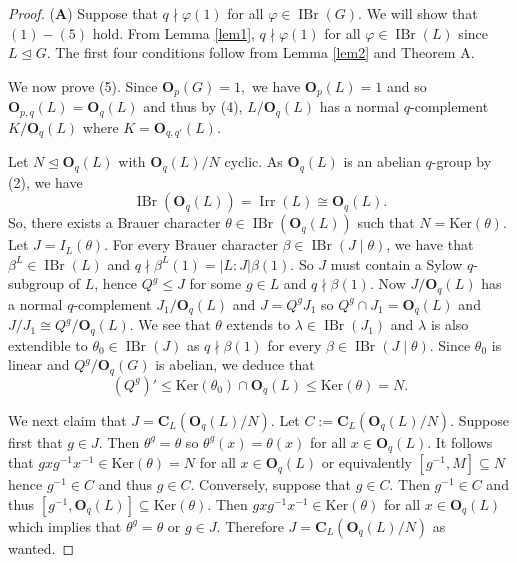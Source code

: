 \documentclass[12pt]{amsart}
\theoremstyle{remark}
\numberwithin{equation}{section}
\begin{document}
\begin{proof}

(\textbf{A}) Suppose that $q\nmid \varphi(1)$ for all $\varphi\in\operatorname{IBr}(G).$ We will show that $(1)-(5)$ hold. From Lemma \ref{lem1}, $q\nmid \varphi(1)$ for all $\varphi\in\operatorname{IBr}(L)$ since $L\unlhd G.$ The first four conditions follow from Lemma \ref{lem2} and Theorem A.

We now prove (5). Since ${\mathbf{O}}_p(G)=1,$ we have ${\mathbf{O}}_p(L)=1$ and so ${\mathbf{O}}_{p,q}(L)={\mathbf{O}}_q(L)$ and thus by (4), $L/{\mathbf{O}}_q(L)$ has a normal $q$-complement $K/{\mathbf{O}}_q(L)$ where $K={\mathbf{O}}_{q,q'}(L).$

Let $N\unlhd {\mathbf{O}}_q(L)$ with ${\mathbf{O}}_q(L)/N$ cyclic. As ${\mathbf{O}}_q(L)$ is an abelian $q$-group by (2), we have $$\operatorname{IBr}({\mathbf{O}}_q(L))=\operatorname{Irr}(L)\cong {\mathbf{O}}_q(L).$$ So, there exists a Brauer character $\theta\in\operatorname{IBr}({\mathbf{O}}_q(L))$ such that $N={{\mathrm {Ker}}}(\theta).$ Let $J=I_L(\theta).$ For every Brauer character $\beta\in\operatorname{IBr}(J \mid \theta)$, we have that $\beta^L\in\operatorname{IBr}(L)$ and $q\nmid \beta^L(1)=|L:J|\beta(1).$ So $J$ must contain a Sylow $q$-subgroup of $L$, hence $Q^g\leq J$ for some $g\in L$ and $q\nmid \beta(1).$ Now $J/{\mathbf{O}}_q(L)$ has a normal $q$-complement $J_1/{\mathbf{O}}_q(L)$ and $J=Q^gJ_1$ so $Q^g\cap J_1={\mathbf{O}}_q(L)$ and $J/J_1\cong Q^g/{\mathbf{O}}_q(L).$ We see that $\theta$ extends to $\lambda\in\operatorname{IBr}(J_1)$ and $\lambda$ is also extendible to $\theta_0\in\operatorname{IBr}(J)$ as $q\nmid \beta(1)$ for every $\beta\in\operatorname{IBr}(J \mid \theta)$. Since $\theta_0$ is linear and $Q^g/{\mathbf{O}}_q(G)$ is abelian, we deduce that $$(Q^g)'\leq {{\mathrm {Ker}}}(\theta_0)\cap {\mathbf{O}}_q(L)\le {{\mathrm {Ker}}}(\theta)=N.$$

\medskip
We next claim that $J={\mathbf{C}}_L({\mathbf{O}}_q(L)/N).$ Let $C:={\mathbf{C}}_L({\mathbf{O}}_q(L)/N).$ Suppose first that $g\in J.$ Then $\theta^g=\theta$ so $\theta^g(x)=\theta(x)$ for all $x\in {\mathbf{O}}_q(L).$ It follows that $gxg^{-1}x^{-1}\in {{\mathrm {Ker}}}(\theta)=N$ for all $x\in{\mathbf{O}}_q(L)$ or equivalently $[g^{-1},M]\subseteq N$ hence $g^{-1}\in C$ and thus $g\in C.$ Conversely, suppose that $g\in C.$ Then $g^{-1}\in C$ and thus $[g^{-1},{\mathbf{O}}_q(L)]\subseteq {{\mathrm {Ker}}}(\theta).$ Then $gxg^{-1}x^{-1}\in {{\mathrm {Ker}}}(\theta)$ for all $x\in {\mathbf{O}}_q(L)$ which implies that $\theta^g=\theta$ or $g\in J.$ Therefore $J={\mathbf{C}}_L({\mathbf{O}}_q(L)/N)$ as wanted.


\end{proof}
\end{document}
